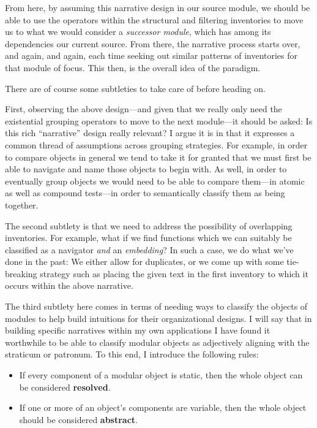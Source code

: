 \documentclass[twoside]{article}
\newcommand{\strong}[1]{{\bfseries #1}}
\begin{document}
From here, by assuming this narrative design in our source module, we should be able to use the operators within the
structural and filtering inventories to move us to what we would consider a \emph{successor module}, which has among
its dependencies our current source. From there, the narrative process starts over, and again, and again, each time
seeking out similar patterns of inventories for that module of focus. This then, is the overall idea of the paradigm.

There are of course some subtleties to take care of before heading on.

First, observing the above design---and given that we really only need the existential grouping operators to move to the next
module---it should be asked: Is this rich ``narrative'' design really relevant? I argue it is in that it expresses a common
thread of assumptions across grouping strategies. For example, in order to compare objects in general we tend to take it
for granted that we must first be able to navigate and name those objects to begin with. As well, in order to eventually
group objects we would need to be able to compare them---in atomic as well as compound tests---in order to semantically
classify them as being together.

The second subtlety is that we need to address the possibility of overlapping inventories. For example, what if we find
functions which we can suitably be classified as a navigator \emph{and} an \emph{embedding}? In such a case, we do what
we've done in the past: We either allow for duplicates, or we come up with some tie-breaking strategy such as placing
the given text in the first inventory to which it occurs within the above narrative.

The third subtlety here comes in terms of needing ways to classify the objects of modules to help build intuitions for
their organizational designs. I will say that in building specific narratives within my own applications I have found
it worthwhile to be able to classify modular objects as adjectively aligning with the straticum or patronum.
To this end, I introduce the following rules:

\begin{itemize}
\item If every component of a modular object is static, then the whole object can be considered \strong{resolved}.
\item If one or more of an object's components are variable, then the whole object should be considered \strong{abstract}.
\end{itemize}
\end{document}

